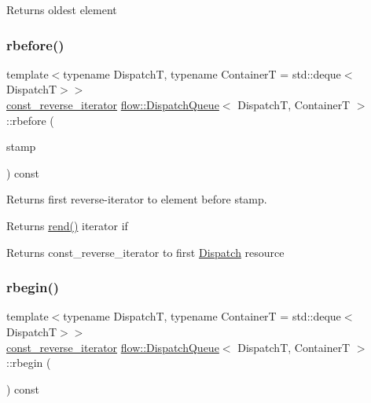 \begin{DoxyReturn}{Returns}
oldest element 
\end{DoxyReturn}
\mbox{\label{classflow_1_1_dispatch_queue_a39b906c46d56d32cda2bc1b61f6dcc32}} 
\subsubsection{\texorpdfstring{rbefore()}{rbefore()}}
{\footnotesize\ttfamily template$<$typename DispatchT, typename ContainerT = std\+::deque$<$\+Dispatch\+T$>$$>$ \\
\hyperlink{classflow_1_1_dispatch_queue_ac74f1a9a8d77b06e9576492df2a50e4f}{const\+\_\+reverse\+\_\+iterator} \hyperlink{classflow_1_1_dispatch_queue}{flow\+::\+Dispatch\+Queue}$<$ DispatchT, ContainerT $>$\+::rbefore (\begin{DoxyParamCaption}\item[{\hyperlink{classflow_1_1_dispatch_queue_affc83531dc53ee147899a33e82a6cbf0}{stamp\+\_\+const\+\_\+arg\+\_\+type}}]{stamp }\end{DoxyParamCaption}) const\hspace{0.3cm}{\ttfamily [inline]}}



Returns first reverse-\/iterator to element before stamp. 

Returns {\ttfamily \hyperlink{classflow_1_1_dispatch_queue_a5fee6900da4ddd095b78608081b1873d}{rend()}} iterator if \begin{DoxyReturn}{Returns}
{\ttfamily const\+\_\+reverse\+\_\+iterator} to first \hyperlink{classflow_1_1_dispatch}{Dispatch} resource 
\end{DoxyReturn}
\mbox{\label{classflow_1_1_dispatch_queue_a969fdabec571725b903056d69ea2a31b}} 
\subsubsection{\texorpdfstring{rbegin()}{rbegin()}}
{\footnotesize\ttfamily template$<$typename DispatchT, typename ContainerT = std\+::deque$<$\+Dispatch\+T$>$$>$ \\
\hyperlink{classflow_1_1_dispatch_queue_ac74f1a9a8d77b06e9576492df2a50e4f}{const\+\_\+reverse\+\_\+iterator} \hyperlink{classflow_1_1_dispatch_queue}{flow\+::\+Dispatch\+Queue}$<$ DispatchT, ContainerT $>$\+::rbegin (\begin{DoxyParamCaption}{ }\end{DoxyParamCaption}) const\hspace{0.3cm}{\ttfamily [inline]}}



